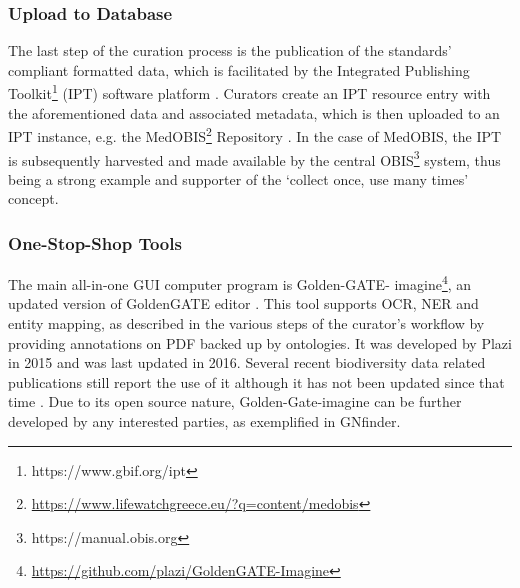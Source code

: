    \subsubsection{Upload to Database}
The last step of the curation process is the publication of the standards’
compliant formatted data, which is facilitated by the Integrated Publishing
Toolkit\footnote{https://www.gbif.org/ipt} (IPT) software platform \parencite{robertson_gbif_2014}.
Curators create an IPT resource entry with the aforementioned data and
associated metadata, which is then uploaded to an IPT instance, e.g. the
MedOBIS\footnote{\url{https://www.lifewatchgreece.eu/?q=content/medobis}}
Repository \parencite{arvanitidis_medobis_2006}. In the case of MedOBIS, the IPT is
subsequently harvested and made available by the central OBIS\footnote{https://manual.obis.org}
system, thus being a strong example and supporter of the ‘collect once, use
many times’ concept.

   \subsubsection{One-Stop-Shop Tools}
The main all-in-one GUI computer program is Golden-GATE-
imagine\footnote{\url{https://github.com/plazi/GoldenGATE-Imagine}}, an updated
version of GoldenGATE editor \parencite{sautter_semi-automated_2007}. This tool
supports OCR, NER and entity mapping, as described in the various steps of the
curator’s workflow by providing annotations on PDF backed up by ontologies. It
was developed by Plazi in 2015 and was last updated in 2016. Several recent
biodiversity data related publications still report the use of it although it
has not been updated since that time
\parencite{10.3897/biss.3.37078,rivera-quiroz_extracting_2019,10.3897/biss.4.59178}.
Due to its open source nature, Golden-Gate-imagine can be further developed by
any interested parties, as exemplified in GNfinder.

\begin{table}[ht]
\large
{}
\caption{The platforms where the CLI workflow was tested.Please note that running time can be affected by internet speed and stability due to API calls. The workflow uses open source tools and software libraries that are distributed across the major platforms; Linux, Mac and Windows.}
\label{table-CLI}
\end{table}

